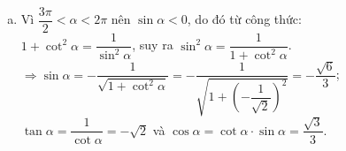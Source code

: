 \begin{vd}
{\begin{enumerate}[a)]
			\item 
			Vì $\dfrac{3\pi}{2}<\alpha<2\pi$ nên $\sin\alpha<0$, do đó từ công thức:\\
			$1+\cot^2\alpha=\dfrac{1}{\sin^2\alpha}$, suy ra $\sin^2\alpha=\dfrac{1}{1+\cot^2\alpha}$.\\
			$\Rightarrow\sin\alpha=-\dfrac{1}{\sqrt{1+\cot^2\alpha}}=-\dfrac{1}{\sqrt{1+\left(-\dfrac{1}{\sqrt{2}}\right)^2}}=-\dfrac{\sqrt{6}}{3}$;\\ $\tan\alpha=\dfrac{1}{\cot\alpha}=-\sqrt{2}$ và $\cos\alpha=\cot\alpha\cdot\sin\alpha=\dfrac{\sqrt{3}}{3}$.
		\end{enumerate}
	}
\end{vd}
